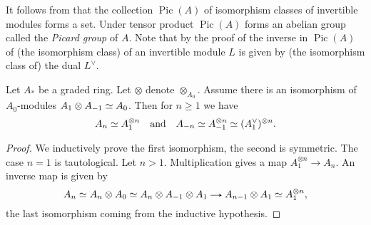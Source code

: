 \newcommand{\Pic}{\operatorname{Pic}}
\begin{definition}
  It follows from  that the
  collection $\Pic(A)$ of isomorphism classes of invertible modules
  forms a set. Under tensor product $\Pic(A)$ forms an abelian group
  called the \emph{Picard group} of $A$. Note that by the proof of
   the inverse in $\Pic(A)$ of (the
  isomorphism class) of an invertible module $L$ is given by (the
  isomorphism class of) the dual $L^\vee$.
\end{definition}

\begin{lemma}
  \label{graded-ring-invertible-components}
  Let $A_*$ be a graded ring. Let $\otimes$ denote
  $\otimes_{A_0}$. Assume there is an isomorphism of $A_0$-modules
  $A_1 \otimes A_{-1} \simeq A_0$. Then for $n \ge 1$ we have
  \[
  A_n \simeq A_1^{\otimes n} \quad\text{and}\quad
  A_{-n} \simeq A_{-1}^{\otimes n} \simeq (A_1^\vee)^{\otimes n}.
  \]
\end{lemma}

\begin{proof}
  We inductively prove the first isomorphism, the second is
  symmetric. The case $n=1$ is tautological. Let $n > 1$.
  Multiplication gives a map $A_1^{\otimes n} \to A_n$. An inverse map
  is given by
  \[
  A_n \iso A_n \otimes A_0 \iso A_n \otimes A_{-1} \otimes A_1 \to
  A_{n-1} \otimes A_1 \iso A_1^{\otimes n},
  \]
  the last isomorphism coming from the inductive hypothesis.
\end{proof}
